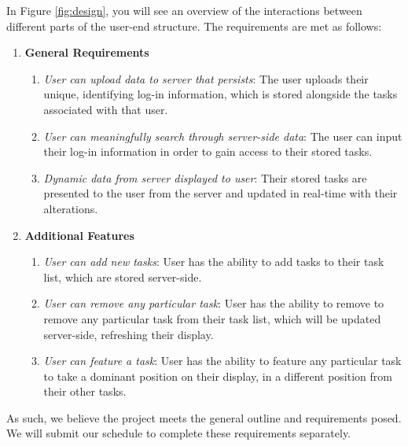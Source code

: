 \documentclass[10pt, letterpaper]{article}
\let\tab\quad
\begin{document}
\tab In Figure \ref{fig:design}, you will see an overview of the interactions between different parts of the user-end structure. The requirements are met as follows:

\begin{enumerate}
	\item \textbf{General Requirements}
	\begin{enumerate}
		\item \emph{User can upload data to server that persists}: The user uploads their unique, identifying log-in information, which is stored alongside the tasks associated with that user.
		\item \emph{User can meaningfully search through server-side data}: The user can input their log-in information in order to gain access to their stored tasks.
		\item \emph{Dynamic data from server displayed to user}: Their stored tasks are presented to the user from the server and updated in real-time with their alterations.
	\end{enumerate}
	\item \textbf{Additional Features}
	\begin{enumerate}
			\item \emph{User can add new tasks}: User has the ability to add tasks to their task list, which are stored server-side.
		\item \emph{User can remove any particular task}: User has the ability to remove to remove any particular task from their task list, which will be updated server-side, refreshing their display.
		\item \emph{User can feature a task}: User has the ability to feature any particular task to take a dominant position on their display, in a different position from their other tasks.
	\end{enumerate}
\end{enumerate}

\tab As such, we believe the project meets the general outline and requirements posed. We will submit our schedule to complete these requirements separately.
\end{document}
